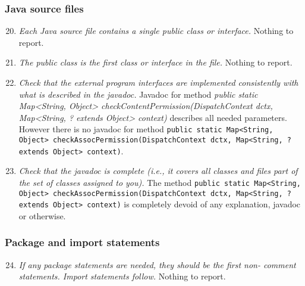 	\subsubsection{Java source files}
		\begin{enumerate}
			\setcounter{enumi}{19}
			\item \textit{Each Java source file contains a single public class or interface.}\newline
			Nothing to report. %

			\item \textit{The public class is the first class or interface in the file.}\newline
			Nothing to report. %

			\item \textit{Check that the external program interfaces are implemented consistently with what is described in the javadoc.}\newline
			Javadoc for method \textit{public static Map<String, Object> checkContentPermission(DispatchContext dctx, Map<String, ? extends Object> context)} describes all needed parameters. However there is no javadoc for method  \texttt{public static Map<String, Object> checkAssocPermission(DispatchContext dctx, Map<String, ? extends Object> context)}.
	
			\item \textit{Check that the javadoc is complete (i.e., it covers all classes and files part of the set of classes assigned to you).}\newline
			The method \texttt{public static Map<String, Object> checkAssocPermission(DispatchContext dctx, Map<String, ? extends Object> context)} is completely devoid of any explanation, javadoc or otherwise. 

		\end{enumerate}

	\subsubsection{Package and import statements}
		\begin{enumerate}
			\setcounter{enumi}{23}
			\item \textit{If any package statements are needed, they should be the first non- comment statements. Import statements follow.}\newline
			Nothing to report. %

		\end{enumerate}

